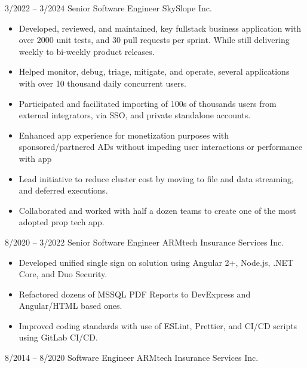 \documentclass[9pt]{basecv} %
\begin{document}
\begin{entrylist}
    \entry
    {3/2022 -- 3/2024}
    {Senior Software Engineer}
    {SkySlope Inc.}
    {\vspace{-9pt}
        \begin{itemize}[noitemsep,topsep=0pt,parsep=0pt,partopsep=0pt, leftmargin=-1pt]
            \item Developed, reviewed, and maintained, key fullstack business application with over 2000 unit tests, and 30 pull requests per sprint. While still delivering weekly to bi-weekly product releases.
            \item Helped monitor, debug, triage, mitigate, and operate, several applications with over 10 thousand daily concurrent users.
            \item Participated and facilitated importing of 100s of thousands users from external integrators, via SSO, and private standalone accounts.
            \item Enhanced app experience for monetization purposes with sponsored/partnered ADs without impeding user interactions or performance with app
            \item Lead initiative to reduce cluster cost by moving to file and data streaming, and deferred executions.
            \item Collaborated and worked with half a dozen teams to create one of the most adopted prop tech app.
        \end{itemize}
    }
    \entry
    {8/2020 -- 3/2022}
    {Senior Software Engineer}
    {ARMtech Insurance Services Inc.}
    {\vspace{-9pt}
        \begin{itemize}[noitemsep,topsep=0pt,parsep=0pt,partopsep=0pt, leftmargin=-1pt]
            \item Developed unified single sign on solution using Angular 2+, Node.js, .NET Core, and Duo Security.
            \item Refactored dozens of MSSQL PDF Reports to DevExpress and Angular/HTML based ones.
            \item Improved coding standards with use of ESLint, Prettier, and CI/CD scripts using GitLab CI/CD.
        \end{itemize}
    }
    \entry
    {8/2014 -- 8/2020}
    {Software Engineer}
    {ARMtech Insurance Services Inc.}
    {\vspace{-9pt}
        \begin{itemize}[noitemsep,topsep=0pt,parsep=0pt,partopsep=0pt, leftmargin=-1pt]

\end{itemize}}
\end{entrylist}
\end{document}
